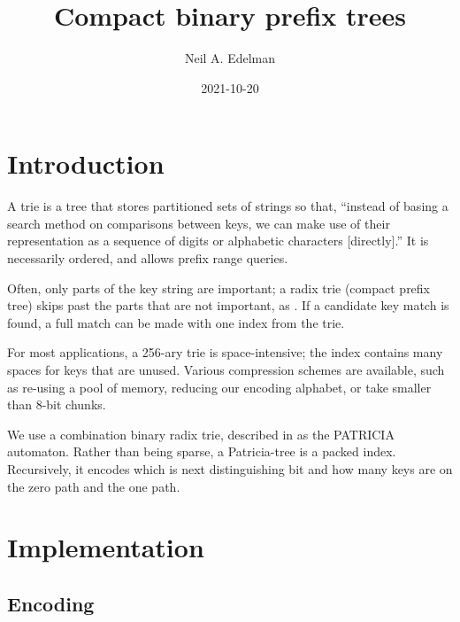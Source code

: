 \documentclass[12pt]{article}
\author{Neil A. Edelman}
\title{Compact binary prefix trees}
\date{2021-10-20}
\begin{document}
\maketitle


\section{Introduction}

A trie is a tree that stores partitioned sets of strings\cite{de1959file, fredkin1960trie, jacquet1991analysis, askitis2011redesigning} so that, ``instead of basing a search method on comparisons between keys, we can make use of their representation as a sequence of digits or alphabetic characters [directly].\cite{knuth1997sorting}'' It is necessarily ordered, and allows prefix range queries.

Often, only parts of the key string are important; a radix trie (compact prefix tree) skips past the parts that are not important, as \cite{askitis2007hat}. If a candidate key match is found, a full match can be made with one index from the trie.

For most applications, a 256-ary trie is space-intensive; the index contains many spaces for keys that are unused. Various compression schemes are available, such as re-using a pool of memory\cite{de1959file}, reducing our encoding alphabet, or take smaller than 8-bit chunks\cite{fredkin1960trie}.

We use a combination binary radix trie, described in \cite{morrison1968patricia} as the PATRICIA automaton. Rather than being sparse, a Patricia-tree is a packed index. Recursively, it encodes which is next distinguishing bit and how many keys are on the zero path and the one path.

\section{Implementation}

\subsection{Encoding}
\end{document}
